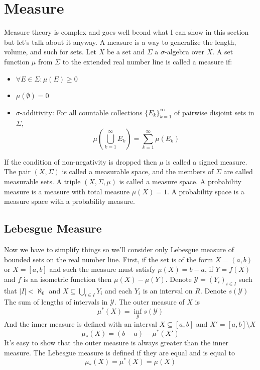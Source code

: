 \documentclass{article}
\theoremstyle{plain}
\begin{document}
\section{Measure}
Measure theory is complex and goes well beond what I can show in this 
section but let's talk about it anyway. A measure is a way to generalize 
the length, volume, and such for sets. 
Let $X$ be a set and $\Sigma$ a $\sigma$-algebra over $X$. 
A set function $\mu$ from $\Sigma$ to the extended real number line is 
called a measure if:
\begin{itemize}
\item $\forall E\in\Sigma:\mu(E)\ge 0$
\item $\mu(\emptyset)=0$
\item $\sigma$-additivity: 
For all countable collections $\{E_k\}_{k=1}^\infty$ of pairwise 
disjoint sets in $\Sigma$,
\[
	\mu\left(\bigcup_{k=1}^\infty{E_k}\right)=\sum_{k=1}^\infty{\mu(E_k)}
\]
\end{itemize}
If the condition of non-negativity is dropped then $\mu$ is called a 
signed measure. The pair $(X,\Sigma)$ is called a measurable space, 
and the members of $\Sigma$ are called measurable sets. 
A triple $(X,\Sigma,\mu)$ is called a measure space. 
A probability measure is a measure with total measure $\mu(X)=1$. 
A probability space is a measure space with a probability measure.
\subsection{Lebesgue Measure}
Now we have to simplify things so we'll consider only Lebesgue measure of 
bounded sets on the real number line. 
First, if the set is of the form $X=(a,b)$ or $X=[a,b]$ and such 
the measure must satisfy $\mu(X)=b-a$, if $Y=f(X)$ and $f$ is an 
isometric function then $\mu(X)-\mu(Y)$. 
Denote $\mathcal{Y}=(Y_i)_{i\in I}$ such that $|I|<\aleph_0$ and 
$X\subseteq \bigcup_{i\in I}{Y_i}$ and each $Y_i$ is an interval on $R$.
Denote $s(\mathcal{Y})$ The sum of lengths of intervals in $\mathcal{Y}$. 
The outer measure of $X$ is
\[
	\mu^*(X) = \inf_{\mathcal{Y}}s(\mathcal{Y})
\]
And the inner measure is defined with an interval $X\subseteq[a,b]$ 
and $X'=[a,b]\setminus X$
\[
	\mu_*(X) = (b-a)- \mu^*(X')
\]
It's easy to show that the outer measure is always greater than the inner
measure. The Lebesgue measure is defined if they are equal and is equal to
\[
	\mu_*(X)=\mu^*(X)=\mu(X)
\]

\newpage
\end{document}

